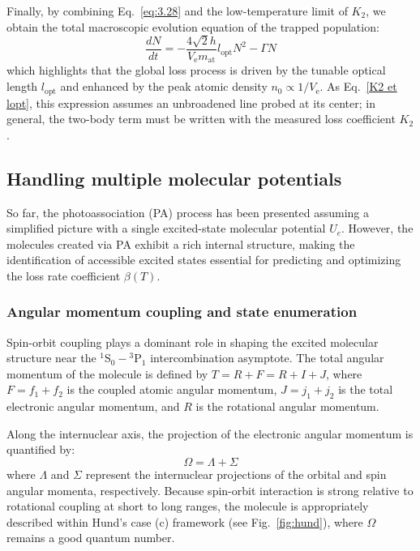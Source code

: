 Finally, by combining Eq.~\ref{eq:3.28} and the low-temperature limit of $K_2$, we obtain the total macroscopic evolution equation of the trapped population:
\begin{equation}
    \frac{dN}{dt} = -\frac{4\sqrt{2} h }{V_{\text{e}} m_{\text{at}}}l_{\text{opt}}N^2 - \Gamma N
\label{one and two body losses equation}
\end{equation}
which highlights that the global loss process is driven by the tunable optical length $l_{\text{opt}}$ and enhanced by the peak atomic density $n_0 \propto 1/V_{\text{e}}$. As Eq.~\ref{K2 et lopt}, this expression
assumes an unbroadened line probed at its center; in general, the two-body term
must be written with the measured loss coefficient $K_2$.

\subsection{Handling multiple molecular potentials}
So far, the photoassociation (PA) process has been presented assuming a simplified picture with a single excited-state molecular potential $U_e$. However, the molecules created via PA exhibit a rich internal 
structure, making the identification of accessible excited states essential for predicting and optimizing the loss rate coefficient $\beta(T)$.

\subsubsection{Angular momentum coupling and state enumeration}
Spin-orbit coupling plays a dominant role in shaping the excited molecular structure near the $^1\text{S}_0 - {}^3\text{P}_1$ intercombination asymptote. The total angular momentum of the molecule is defined by 
$T = R + F = R + I + J$, where $F = f_1 + f_2$ is the coupled atomic angular momentum, $J = j_1 + j_2$ is the total electronic angular momentum, and $R$ is the rotational angular momentum.

Along the internuclear axis, the projection of the electronic angular momentum is quantified by:
\begin{equation}
    \Omega = \Lambda + \Sigma
\end{equation}
where $\Lambda$ and $\Sigma$ represent the internuclear projections of the orbital and spin angular momenta, respectively. Because spin-orbit interaction is strong relative to rotational coupling at short to 
long ranges, the molecule is appropriately described within Hund's case (c) framework (see Fig.~\ref{fig:hund}), where $\Omega$ remains a good quantum number.

